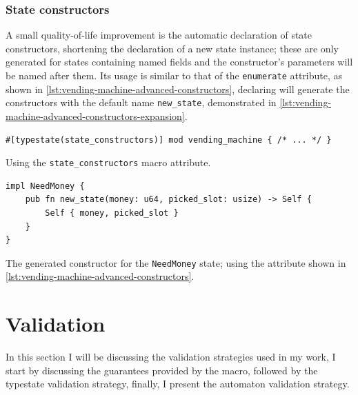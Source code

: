 \subsubsection{State constructors}

A small quality-of-life improvement is the automatic declaration of state constructors,
shortening the declaration of a new state instance;
these are only generated for states containing named fields and
the constructor's parameters will be named after them. %
Its usage is similar to that of the \texttt{enumerate} attribute, as shown in \autoref{lst:vending-machine-advanced-constructors},
declaring  will generate the constructors with the default name \texttt{new\_state},
demonstrated in \autoref{lst:vending-machine-advanced-constructors-expansion}.

\begin{listing}
    \begin{verbatim}
#[typestate(state_constructors)] mod vending_machine { /* ... */ }
    \end{verbatim}
    \caption{Using the \texttt{state\_constructors} macro attribute.}
    \label{lst:vending-machine-advanced-constructors}
\end{listing}


\begin{listing}
    \begin{verbatim}
impl NeedMoney {
    pub fn new_state(money: u64, picked_slot: usize) -> Self {
        Self { money, picked_slot }
    }
}
    \end{verbatim}
    \caption{
        The generated constructor for the \texttt{NeedMoney} state;
        using the attribute shown in \autoref{lst:vending-machine-advanced-constructors}.
    }
    \label{lst:vending-machine-advanced-constructors-expansion}
\end{listing}



\section{Validation}\label{sec:validation}

In this section I will be discussing the validation strategies used in my work,
I start by discussing the guarantees provided by the macro,
followed by the typestate validation strategy, finally, I present the automaton validation strategy.

